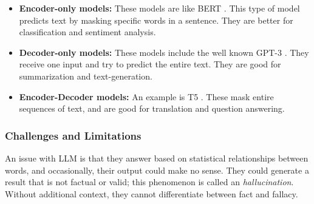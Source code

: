 \begin{itemize}
\item{\textbf{Encoder-only models:}} These models are like BERT \cite{DBLP:journals/corr/abs-1810-04805}. This type of model predicts text by masking specific words in a sentence. They are better for classification and sentiment analysis.
\item{\textbf{Decoder-only models:}} These models include the well known GPT-3 \cite{DBLP:journals/corr/abs-2005-14165}. They receive one input and try to predict the entire text. They are good for summarization and text-generation.
\item{\textbf{Encoder-Decoder models:}} An example is T5 \cite{2020t5}. These mask entire sequences of text, and are good for translation and question  answering.
\end{itemize}




\subsubsection{Challenges and Limitations}
An issue with LLM is that they answer based on statistical relationships between words, and occasionally, their output could make no sense. They could generate a result that is not factual
or valid; this phenomenon is called an {\em hallucination}. Without additional context, they cannot differentiate between fact and fallacy. %

